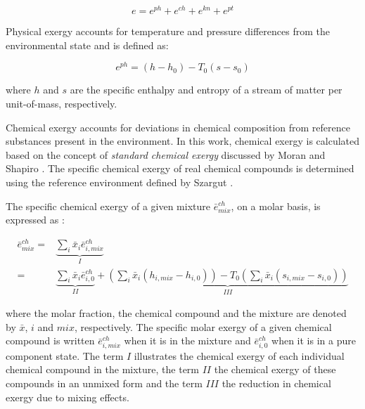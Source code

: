 \documentclass[final,times,5p]{elsarticle}
\begin{document}
		
	\begin{equation}
		e=e^{ph}+e^{ch}+e^{kn}+e^{pt}
	\end{equation}

	Physical exergy accounts for temperature and pressure differences from the environmental state and is defined as:  
		
	\begin{equation}
		e^{ph}=(h-h_0)-T_0(s-s_0) 
	\end{equation}
	
	where $h$ and $s$ are the specific enthalpy and entropy of a stream of matter per unit-of-mass, respectively. 

	Chemical exergy accounts for deviations in chemical composition from reference substances present in the environment. In this work, chemical exergy is calculated based on the concept of \emph{standard chemical exergy} discussed by Moran and Shapiro \cite{Moran2007}. The specific chemical exergy of real chemical compounds is determined using the reference environment defined by Szargut \cite{Szargut1988,Szargut1989,Morris1986}.

	
	The specific chemical exergy of a given mixture $\bar{e}^{ch}_{mix}$, on a molar basis, is expressed as \cite{Sato2004}:

	\begin{align}
		\bar{e}^{ch}_{mix}=&\underbrace{\sum_i \bar{x}_i \bar{e}^{ch}_{i,mix}}_{I} \nonumber\\
		=&\underbrace{\sum_i \bar{x}_i \bar{e}^{ch}_{i,0}}_{II}+\underbrace{\left(\sum_i \bar{x}_i \left(h_{i,mix}-h_{i,0}\right)\right)-T_0\left(\sum_i \bar{x}_i \left(s_{i,mix}-s_{i,0}\right)\right)}_{III}
	\end{align}

	where the molar fraction, the chemical compound and the mixture are denoted by $\bar{x}$, $i$ and $mix$, respectively. The specific molar exergy of a given chemical compound is written $\bar{e}^{ch}_{i,mix}$ when it is in the mixture and $\bar{e}^{ch}_{i,0}$ when it is in a pure component state. The term $I$ illustrates the chemical exergy of each individual chemical compound in the mixture, the term $II$ the chemical exergy of these compounds in an unmixed form and the term $III$ the reduction in chemical exergy due to mixing effects.  
	
\end{document}
